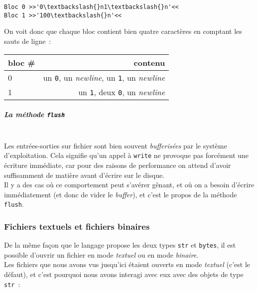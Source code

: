     \begin{Verbatim}[commandchars=\\\{\}]
Bloc 0 >>'0\textbackslash{}n1\textbackslash{}n'<<
Bloc 1 >>'100\textbackslash{}n'<<

    \end{Verbatim}

    On voit donc que chaque bloc contient bien quatre caractères en comptant
les sauts de ligne~:

\begin{longtable}[]{@{}lr@{}}
\toprule
bloc \# & contenu\tabularnewline
\midrule
\endhead
0 & un \texttt{0}, un \emph{newline}, un \texttt{1}, un
\emph{newline}\tabularnewline
1 & un \texttt{1}, deux \texttt{0}, un \emph{newline}\tabularnewline
\bottomrule
\end{longtable}

    \hypertarget{la-muxe9thode-flush}{%
\subparagraph{\texorpdfstring{La méthode
\texttt{flush}}{La méthode flush}\\\\}\label{la-muxe9thode-flush}}

    Les entrées-sorties sur fichier sont bien souvent \emph{bufferisées} par
le système d'exploitation. Cela signifie qu'un appel à \texttt{write} ne
provoque pas forcément une écriture immédiate, car pour des raisons de
performance on attend d'avoir suffisamment de matière avant d'écrire sur
le disque.\\

Il y a des cas où ce comportement peut s'avérer gênant, et où on a
besoin d'écrire immédiatement (et donc de vider le \emph{buffer}), et
c'est le propos de la méthode \texttt{flush}.

    \hypertarget{fichiers-textuels-et-fichiers-binaires}{%
\subsubsection{Fichiers textuels et fichiers
binaires}\label{fichiers-textuels-et-fichiers-binaires}}

    De la même façon que le langage propose les deux types \texttt{str} et
\texttt{bytes}, il est possible d'ouvrir un fichier en mode
\emph{textuel} ou en mode \emph{binaire}.\\

    Les fichiers que nous avons vus jusqu'ici étaient ouverts en mode
\emph{textuel} (c'est le défaut), et c'est pourquoi nous avons interagi
avec eux avec des objets de type \texttt{str}~:


